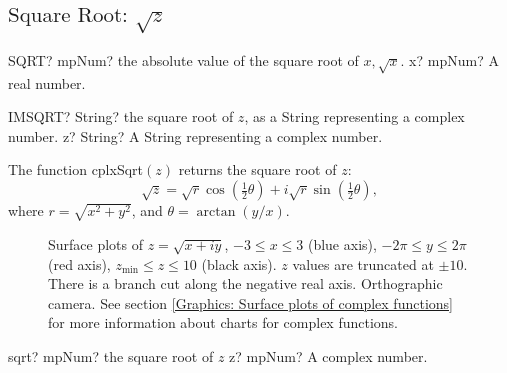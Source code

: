 \newpage
\subsection{\texorpdfstring{$\text{Square Root: }\sqrt{z}$}{sqrt}}


\begin{mpFunctionsExtract}
	\mpWorksheetFunctionOneNotImplemented
	{SQRT? mpNum? the absolute value of the square root of $x, \sqrt{x}$.}
	{x? mpNum? A real number.}
\end{mpFunctionsExtract}


\vspace{0.6cm}
\begin{mpFunctionsExtract}
	\mpWorksheetFunctionOneNotImplemented
	{IMSQRT? String? the square root of $z$, as a String representing a complex number.}
	{z? String? A String representing a complex number.}
\end{mpFunctionsExtract}

\vspace{0.3cm}

The function \textsf{cplxSqrt$(z)$} returns the square root of $z$: 
\begin{equation}
	\sqrt{z} = \sqrt{r} \cos\left(\tfrac{1}{2}\theta\right) + i  \sqrt{r} \sin\left(\tfrac{1}{2}\theta\right),
\end{equation}
where $r=\sqrt{x^2+y^2}$, and $\theta=\arctan(y/x)$.


\begin{figure}[ht]%
	\centering
	\qquad
	\caption[Complex Square Root]{Surface plots of $z = \sqrt{x + iy}$, $-3 \leq x \leq 3$ (blue axis), $-2 \pi \leq y \leq 2\pi$ (red axis), $z_{\text{min}} \leq z \leq 10$ (black axis). $z$ values are truncated at $\pm 10$. There is a branch cut along the negative real axis. Orthographic camera. See section \ref{Graphics: Surface plots of complex functions} for more information about charts for complex functions.} 
	\label{fig:Complex Square Root}%
\end{figure}

\vspace{0.6cm}
\begin{mpFunctionsExtract}
	\mpFunctionOne
	{sqrt? mpNum? the square root of $z$}
	{z? mpNum? A complex number.}
\end{mpFunctionsExtract}

